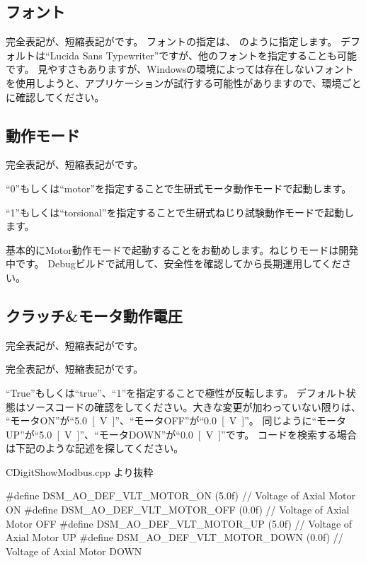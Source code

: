 \subsection{フォント}
完全表記が、短縮表記がです。
フォントの指定は、 のように指定します。
デフォルトは``Lucida Sans Typewriter''ですが、他のフォントを指定することも可能です。
見やすさもありますが、Windowsの環境によっては存在しないフォントを使用しようと、アプリケーションが試行する可能性がありますので、環境ごとに確認してください。

\subsection{動作モード}
完全表記が、短縮表記がです。

``0''もしくは``motor''を指定することで生研式モータ動作モードで起動します。

``1''もしくは``torsional''を指定することで生研式ねじり試験動作モードで起動します。

基本的にMotor動作モードで起動することをお勧めします。ねじりモードは開発中です。
Debugビルドで試用して、安全性を確認してから長期運用してください。

\subsection{クラッチ\&モータ動作電圧}
完全表記が、短縮表記がです。

完全表記が、短縮表記がです。

``True''もしくは``true''、``1''を指定することで極性が反転します。
デフォルト状態はソースコードの確認をしてください。大きな変更が加わっていない限りは、
``モータON''が``\qty{5.0}{[V]}''、``モータOFF''が``\qty{0.0}{[V]}''。
同じように``モータUP''が``\qty{5.0}{[V]}''、``モータDOWN''が``\qty{0.0}{[V]}''です。
コードを検索する場合は下記のような記述を探してください。
\begin{tcbcodeblock}{CDigitShowModbus.cpp より抜粋 }
    \begin{lstcodeblock}[language=C++]
#define DSM_AO_DEF_VLT_MOTOR_ON (5.0f)			// Voltage of Axial Motor ON
#define DSM_AO_DEF_VLT_MOTOR_OFF (0.0f)			// Voltage of Axial Motor OFF
#define DSM_AO_DEF_VLT_MOTOR_UP (5.0f)			// Voltage of Axial Motor UP
#define DSM_AO_DEF_VLT_MOTOR_DOWN (0.0f)		// Voltage of Axial Motor DOWN
\end{lstcodeblock}
\end{tcbcodeblock}

